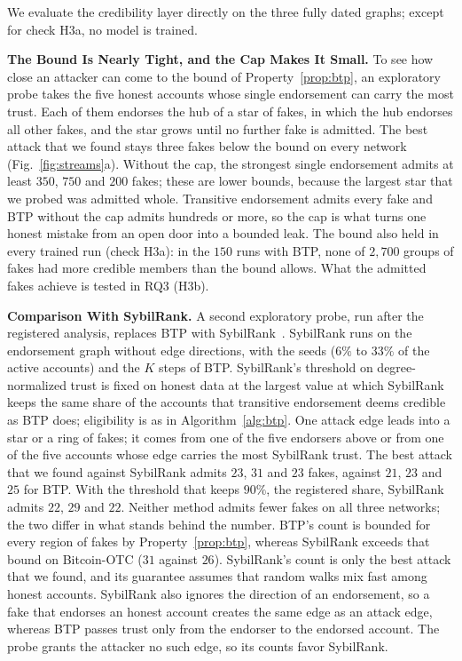 \documentclass[lettersize,journal]{IEEEtran}
\begin{document}
We evaluate the credibility layer directly on the three fully dated graphs; except for check H3a, no model is trained.

\smallskip\noindent\textbf{The Bound Is Nearly Tight, and the Cap Makes It Small.}
To see how close an attacker can come to the bound of Property~\ref{prop:btp}, an exploratory probe takes the five honest accounts whose single endorsement can carry the most trust.
Each of them endorses the hub of a star of fakes, in which the hub endorses all other fakes, and the star grows until no further fake is admitted.
The best attack that we found stays three fakes below the bound on every network (Fig.~\ref{fig:streams}a).
Without the cap, the strongest single endorsement admits at least $350$, $750$ and $200$ fakes; these are lower bounds, because the largest star that we probed was admitted whole.
Transitive endorsement admits every fake and BTP without the cap admits hundreds or more, so the cap is what turns one honest mistake from an open door into a bounded leak.
The bound also held in every trained run (check H3a): in the $150$ runs with BTP, none of $2{,}700$ groups of fakes had more credible members than the bound allows. What the admitted fakes achieve is tested in RQ3 (H3b).

\smallskip\noindent\textbf{Comparison With SybilRank.}
A second exploratory probe, run after the registered analysis, replaces BTP with SybilRank~\cite{cao2012aiding}. SybilRank runs on the endorsement graph without edge directions, with the seeds ($6\%$ to $33\%$ of the active accounts) and the $K$ steps of BTP.
SybilRank's threshold on degree-normalized trust is fixed on honest data at the largest value at which SybilRank keeps the same share of the accounts that transitive endorsement deems credible as BTP does; eligibility is as in Algorithm~\ref{alg:btp}.
One attack edge leads into a star or a ring of fakes; it comes from one of the five endorsers above or from one of the five accounts whose edge carries the most SybilRank trust.
The best attack that we found against SybilRank admits $23$, $31$ and $23$ fakes, against $21$, $23$ and $25$ for BTP.
With the threshold that keeps $90\%$, the registered share, SybilRank admits $22$, $29$ and $22$.
Neither method admits fewer fakes on all three networks; the two differ in what stands behind the number.
BTP's count is bounded for every region of fakes by Property~\ref{prop:btp}, whereas SybilRank exceeds that bound on Bitcoin-OTC ($31$ against $26$).
SybilRank's count is only the best attack that we found, and its guarantee assumes that random walks mix fast among honest accounts.
SybilRank also ignores the direction of an endorsement, so a fake that endorses an honest account creates the same edge as an attack edge, whereas BTP passes trust only from the endorser to the endorsed account.
The probe grants the attacker no such edge, so its counts favor SybilRank.
\end{document}

